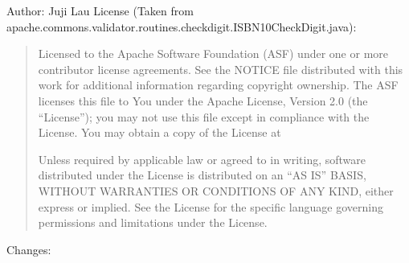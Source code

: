 \documentclass[letterpaper,10pt,english]{sphinxmanual}
\begin{document}
\sphinxAtStartPar
Author: Juji Lau
License (Taken from apache.commons.validator.routines.checkdigit.ISBN10CheckDigit.java):
\begin{quote}

\sphinxAtStartPar
Licensed to the Apache Software Foundation (ASF) under one or more
contributor license agreements. See the NOTICE file distributed with
this work for additional information regarding copyright ownership.
The ASF licenses this file to You under the Apache License, Version 2.0
(the “License”); you may not use this file except in compliance with
the License. You may obtain a copy of the License at
\begin{quote}

\sphinxAtStartPar
{}
\end{quote}

\sphinxAtStartPar
Unless required by applicable law or agreed to in writing, software
distributed under the License is distributed on an “AS IS” BASIS,
WITHOUT WARRANTIES OR CONDITIONS OF ANY KIND, either express or implied.
See the License for the specific language governing permissions and
limitations under the License.
\end{quote}

\sphinxAtStartPar
Changes:
\end{document}
